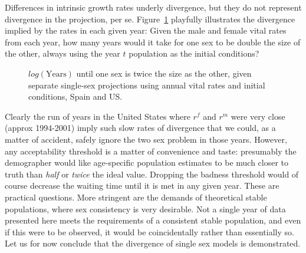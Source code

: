 Differences in intrinsic growth rates underly divergence, but they
do not represent divergence in the projection, per se.
Figure~\ref{fig:rSRdoubling} playfully illustrates the divergence implied by the 
rates in each given year: Given the
male and female vital rates from each year, how many years would it take for one
sex to be double the size of the other, always using the year $t$ population as
the initial conditions?

\begin{figure}[ht!]
        \centering  
          \caption{$log(\mathrm{Years})$ until one sex is twice the size as the
          other, given separate single-sex projections using annual vital rates and initial
          conditions, Spain and US.}
           \quad
          \label{fig:rSRdoubling}
\end{figure}

Clearly the run of years in the United States where $r^f$ and $r^m$ were very
close (approx 1994-2001) imply such slow rates of divergence that we could, as a
matter of accident, safely ignore the two sex problem in those years.
However, any acceptability threshold is a matter of convenience and taste:
presumably the demographer would like age-specific population estimates to be
much closer to truth than \textit{half} or \textit{twice} the ideal value.
Dropping the badness threshold would of course decrease the waiting time until
it is met in any given year. These are practical questions. More
stringent are the demands of theoretical stable populations, where
sex consistency is very desirable. Not a single year of data presented here
meets the requirements of a consistent stable population, and even if this were
to be observed, it would be coincidentally rather than essentially so. Let us
for now conclude that the divergence of single sex models is demonstrated.












